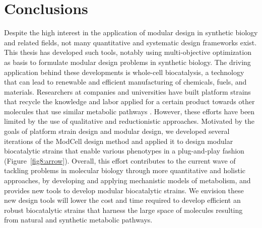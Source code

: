 
\renewcommand{\thefigure}{\roman{figure}} %
\setcounter{figure}{0}

\chapter*{Conclusions} \label{ch:conclusion}




Despite the high interest in the application of modular design in synthetic biology and related fields,
not many quantitative and systematic design frameworks exist.
This thesis has developed such tools, notably using multi-objective optimization as basis to formulate modular design problems in synthetic biology.
The driving application behind these developments is whole-cell biocatalysis, a technology that can lead to renewable and efficient manufacturing of chemicals, fuels, and materials.
Researchers at companies and universities have built platform strains that recycle the knowledge and labor applied for a certain product towards other molecules that use similar metabolic pathways \citep{nielsen2016}.
However, these efforts have been limited by the use of qualitative and reductionistic approaches.
Motivated by the goals of platform strain design and modular design, we developed several iterations of the ModCell design method and applied it to design modular biocatalytic strains that enable various phenotypes in a plug-and-play fashion (Figure~\ref{fig8:arrow}).
Overall, this effort contributes to the current wave of tackling problems in molecular biology through more quantitative and holistic approaches, by developing and applying mechanistic models of metabolism, and provides new tools to develop modular biocatalytic strains. %
We envision these new design tools will lower the cost and time required to develop efficient an robust biocatalytic strains that harness the large space of molecules resulting from natural and synthetic metabolic pathways.

